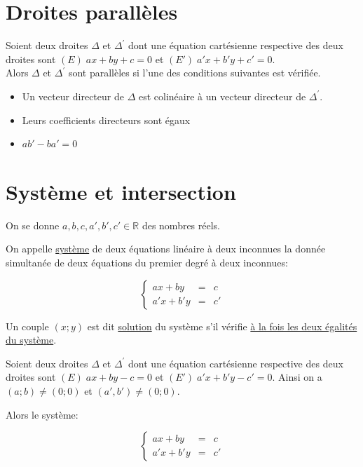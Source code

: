 \documentclass[french]{book}
\begin{document}
\section{Droites parallèles}
\begin{prop}
Soient deux droites $\Delta$ et $\Delta^{'}$ dont une équation cartésienne respective des deux droites sont $(E)\; ax+by+c=0$ et $(E')\; a'x+b'y+c'=0$. \\

Alors $\Delta$ et $\Delta^{'}$ sont parallèles si l'une des conditions suivantes est vérifiée.

\begin{itemize}
\item Un vecteur directeur de $\Delta$ est colinéaire à un vecteur directeur de $\Delta^{'}$.
\item Leurs coefficients directeurs sont égaux
\item $ab'-ba'=0$
\end{itemize}

\end{prop}

\section{Système et intersection}

On se donne $a,b,c,a',b',c' \in \mathbb{R}$ des nombres réels.

\begin{defn}
On appelle \underline{système} de deux équations linéaire à deux inconnues la donnée simultanée de deux équations du premier degré à deux inconnues: 

$$
\left \{
\begin{array}{rcl}
ax+by&=&c \\
a'x+b'y&=&c'
\end{array}
\right. 
$$

Un couple $(x;y)$ est dit \underline{solution} du système s'il vérifie \underline{à la fois les deux égalités du système}.

\end{defn}

Soient deux droites $\Delta$ et $\Delta^{'}$ dont une équation cartésienne respective des deux droites sont $(E)\; ax+by-c=0$ et $(E')\; a'x+b'y-c'=0$. Ainsi on a $(a;b) \neq (0;0)$ et $(a',b') \neq (0;0)$.

Alors le système: 

$$
\left \{
\begin{array}{rcl}
ax+by&=&c \\
a'x+b'y&=&c'
\end{array}
\right. 
$$ 
\end{document}
